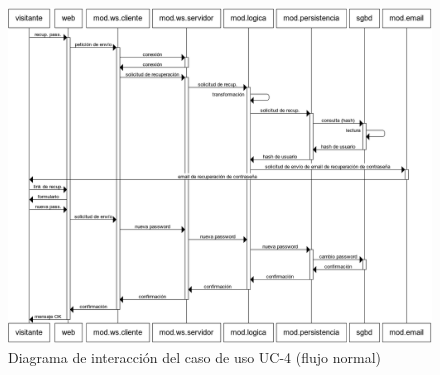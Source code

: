 \begin{enumerate}
  \begin{figure}[h]
    \begin{center}
      \includegraphics[width=\textwidth]{images/uc-4.png}
      \caption{Diagrama de interacción del caso de uso UC-4 (flujo normal)}
      \label{fig::uc-4}
    \end{center}
  \end{figure}


\end{enumerate}
